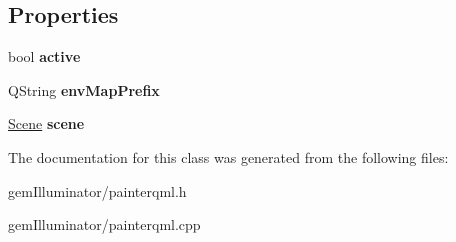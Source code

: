 \subsection*{Properties}
\begin{DoxyCompactItemize}
\item 
\hypertarget{class_painter_q_m_l_ae3e2f50a3b7fc1d136f408a2b6745e73}{}bool {\bfseries active}\label{class_painter_q_m_l_ae3e2f50a3b7fc1d136f408a2b6745e73}

\item 
\hypertarget{class_painter_q_m_l_ab9c17177ba01d52fcc85606cd18cc3fe}{}Q\+String {\bfseries env\+Map\+Prefix}\label{class_painter_q_m_l_ab9c17177ba01d52fcc85606cd18cc3fe}

\item 
\hypertarget{class_painter_q_m_l_a59b4d398bc7880e59bc8296c2669aaab}{}\hyperlink{class_scene}{Scene} {\bfseries scene}\label{class_painter_q_m_l_a59b4d398bc7880e59bc8296c2669aaab}

\end{DoxyCompactItemize}


The documentation for this class was generated from the following files\+:\begin{DoxyCompactItemize}
\item 
gem\+Illuminator/painterqml.\+h\item 
gem\+Illuminator/painterqml.\+cpp\end{DoxyCompactItemize}
